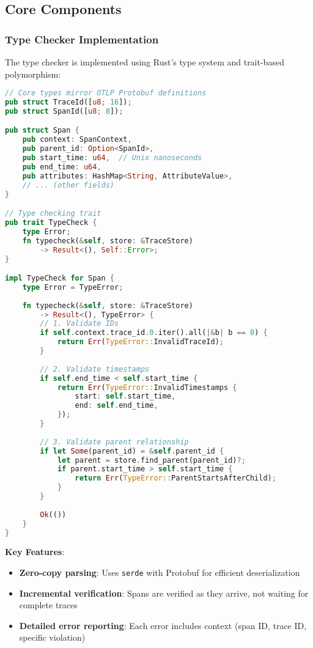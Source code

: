 \subsection{Core Components}
\label{sec:impl-components}

\subsubsection{Type Checker Implementation}

The type checker is implemented using Rust's type system and trait-based polymorphism:

\begin{small}
\begin{lstlisting}[language=Rust]
// Core types mirror OTLP Protobuf definitions
pub struct TraceId([u8; 16]);
pub struct SpanId([u8; 8]);

pub struct Span {
    pub context: SpanContext,
    pub parent_id: Option<SpanId>,
    pub start_time: u64,  // Unix nanoseconds
    pub end_time: u64,
    pub attributes: HashMap<String, AttributeValue>,
    // ... (other fields)
}

// Type checking trait
pub trait TypeCheck {
    type Error;
    fn typecheck(&self, store: &TraceStore) 
        -> Result<(), Self::Error>;
}

impl TypeCheck for Span {
    type Error = TypeError;
    
    fn typecheck(&self, store: &TraceStore) 
        -> Result<(), TypeError> {
        // 1. Validate IDs
        if self.context.trace_id.0.iter().all(|&b| b == 0) {
            return Err(TypeError::InvalidTraceId);
        }
        
        // 2. Validate timestamps
        if self.end_time < self.start_time {
            return Err(TypeError::InvalidTimestamps {
                start: self.start_time,
                end: self.end_time,
            });
        }
        
        // 3. Validate parent relationship
        if let Some(parent_id) = &self.parent_id {
            let parent = store.find_parent(parent_id)?;
            if parent.start_time > self.start_time {
                return Err(TypeError::ParentStartsAfterChild);
            }
        }
        
        Ok(())
    }
}
\end{lstlisting}
\end{small}

\textbf{Key Features}:
\begin{itemize}
\item \textbf{Zero-copy parsing}: Uses \texttt{serde} with Protobuf for efficient deserialization
\item \textbf{Incremental verification}: Spans are verified as they arrive, not waiting for complete traces
\item \textbf{Detailed error reporting}: Each error includes context (span ID, trace ID, specific violation)
\end{itemize}

